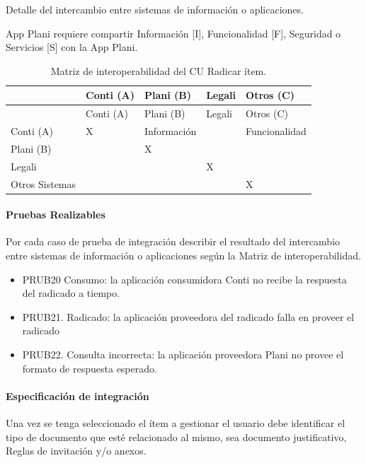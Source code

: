 \documentclass[
  paper=a4,
  ,captions=tableheading
]{scrartcl}
\providecommand{\tightlist}{%
  \setlength{\itemsep}{0pt}\setlength{\parskip}{0pt}}
\begin{document}
Detalle del intercambio entre sistemas de información o aplicaciones.

App Plani requiere compartir Información {[}I{]}, Funcionalidad {[}F{]},
Seguridad o Servicios {[}S{]} con la App Plani.

\begin{longtable}[]{@{}lllll@{}}
\caption{Matriz de interoperabilidad del CU Radicar
ítem.}\tabularnewline
\toprule\noalign{}
& Conti (A) & Plani (B) & Legali & Otros (C) \\
\midrule\noalign{}
\endfirsthead
\toprule\noalign{}
& Conti (A) & Plani (B) & Legali & Otros (C) \\
\midrule\noalign{}
\endhead
\bottomrule\noalign{}
\endlastfoot
Conti (A) & X & Información & & Funcionalidad \\
Plani (B) & & X & & \\
Legali & & & X & \\
Otros Sistemas & & & & X \\
\end{longtable}

\paragraph{Pruebas Realizables}\label{sec:pruebas-realizables-2}

Por cada caso de prueba de integración describir el resultado del
intercambio entre sistemas de información o aplicaciones según la Matriz
de interoperabilidad.

\begin{itemize}
\tightlist
\item
  PRUB20 Consumo: la aplicación consumidora Conti no recibe la respuesta
  del radicado a tiempo.
\item
  PRUB21. Radicado: la aplicación proveedora del radicado falla en
  proveer el radicado
\item
  PRUB22. Consulta incorrecta: la aplicación proveedora Plani no provee
  el formato de respuesta esperado.
\end{itemize}

\paragraph{Especificación de
integración}\label{sec:especificaciuxf3n-de-integraciuxf3n-3}

Una vez se tenga seleccionado el ítem a gestionar el usuario debe
identificar el tipo de documento que esté relacionado al mismo, sea
documento justificativo, Reglas de invitación y/o anexos.
\end{document}

